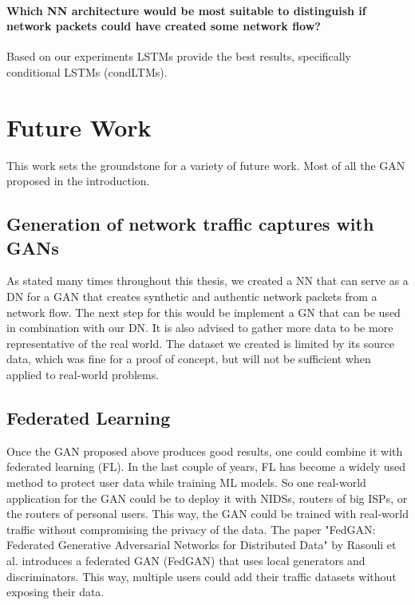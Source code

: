 \documentclass[
	ngerman,
	ruledheaders=section,%
	class=report,%
	thesis={type=bachelor},%
	accentcolor=9c,%
	custommargins=true,%
	marginpar=false,%
	parskip=half-,%
	fontsize=11pt,%
]{tudapub}
\begin{document}
\paragraph{Which NN architecture would be most suitable to distinguish if network packets could have created some network flow?}
Based on our experiments LSTMs provide the best results, specifically conditional LSTMs (condLTMs).

\section{Future Work}

This work sets the groundstone for a variety of future work.
Most of all the GAN proposed in the introduction.

\subsection{Generation of network traffic captures with GANs}

As stated many times throughout this thesis, we created a NN that can serve as a DN for a GAN that creates synthetic and authentic network packets from a network flow.
The next step for this would be implement a GN that can be used in combination with our DN.
It is also advised to gather more data to be more representative of the real world.
The dataset we created is limited by its source data, which was fine for a proof of concept, but will not be sufficient when applied to real-world problems.

\subsection{Federated Learning}

Once the GAN proposed above produces good results, one could combine it with federated learning (FL).
In the last couple of years, FL has become a widely used method to protect user data while training ML models.
So one real-world application for the GAN could be to deploy it with NIDSs, routers of big ISPs, or the routers of personal users.
This way, the GAN could be trained with real-world traffic without compromising the privacy of the data.
The paper "FedGAN: Federated Generative Adversarial Networks for Distributed Data" by Rasouli et al. \cite{rasouliFedGANFederatedGenerative2020} introduces a federated GAN (FedGAN) that uses local generators and discriminators.
This way, multiple users could add their traffic datasets without exposing their data.
\end{document}
